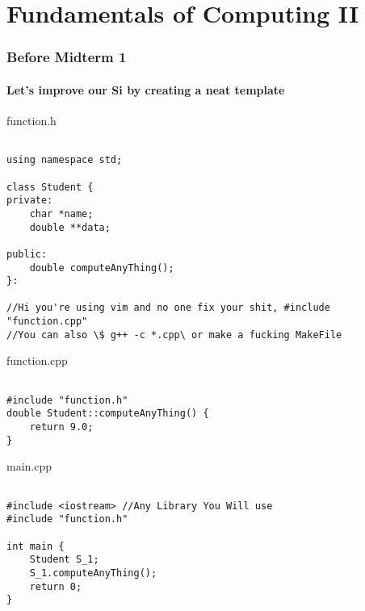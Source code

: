\documentclass{article}
\begin{document}
\maketitle
{}

\newpage
\tableofcontents

\newpage
{}


\part{Fundamentals of Computing II}
\newpage

\section{Before Midterm 1} 

\subsection{Let's improve our Si by creating a neat template}

\subparagraph{function.h}
\begin{lstlisting}

using namespace std;

class Student {
private:
	char *name;
	double **data;

public:
	double computeAnyThing();
}:

//Hi you're using vim and no one fix your shit, #include "function.cpp"
//You can also \$ g++ -c *.cpp\ or make a fucking MakeFile
\end{lstlisting}

\subparagraph{function.cpp}
\begin{lstlisting}

#include "function.h"
double Student::computeAnyThing() {
	return 9.0;
}

\end{lstlisting}

\subparagraph{main.cpp}
\begin{lstlisting}
	
#include <iostream> //Any Library You Will use
#include "function.h"

int main {
	Student S_1;
	S_1.computeAnyThing();
	return 0;
}
\end{lstlisting}

\newpage
\end{document}
